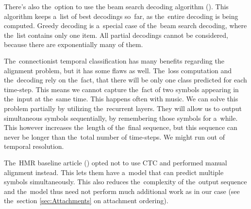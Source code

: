 There's also the~option to use the beam search decoding algorithm (\cite{CtcBeamSearch}). This algorithm keeps a~list of best decodings so~far, as the~entire decoding is being computed. Greedy decoding is a~special case of the~beam search decoding, where the~list contains only one item. All partial decodings cannot be considered, because there are exponentially many of them.

The~connectionist temporal classification has many benefits regarding the alignment problem, but it has some flaws as well. The~loss computation and the~decoding rely on the~fact, that there will be only one class predicted for each time-step. This means we cannot capture the~fact of two symbols appearing in the~input at the~same time. This happens often with music. We can solve this problem partially by utilizing the~recurrent layers. They will allow us to output simultaneous symbols sequentially, by remembering those symbols for a~while. This however increases the~length of the~final sequence, but this sequence can never be longer than the~total number of time-steps. We might run out of temporal resolution.

The~HMR baseline article (\cite{HmrBaseline}) opted not to use CTC and performed manual alignment instead. This lets them have a~model that can predict multiple symbols simultaneously. This also reduces the~complexity of the~output sequence and the~model thus need not perform much additional work as in our case (see the~section \ref{sec:Attachments} on attachment ordering).
